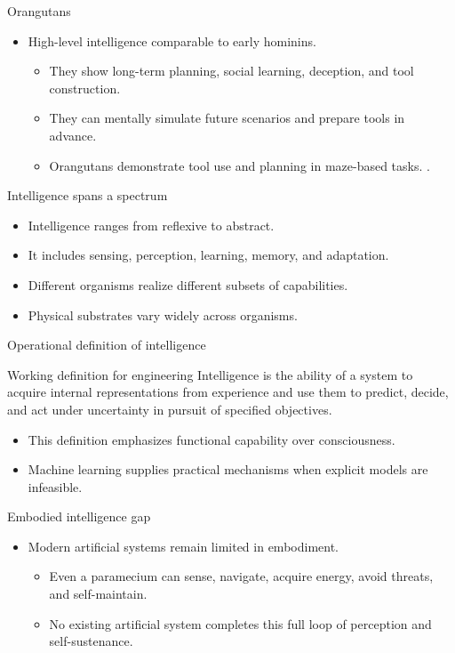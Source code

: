 \documentclass[12pt]{beamer}
\begin{document}
\begin{frame}{Orangutans}
  \begin{itemize}
    \item High-level intelligence comparable to early hominins.
      \begin{itemize}
        \item They show long-term planning, social learning, deception, and tool construction.
        \item They can mentally simulate future scenarios and prepare tools in advance.
        \item Orangutans demonstrate tool use and planning in maze-based tasks. .
       \end{itemize}
  \end{itemize}
\end{frame}

\begin{frame}{Intelligence spans a spectrum}
  \begin{itemize}
    \item Intelligence ranges from reflexive to abstract.
    \item It includes sensing, perception, learning, memory, and adaptation.
    \item Different organisms realize different subsets of capabilities.
    \item Physical substrates vary widely across organisms.
  \end{itemize}
\end{frame}

\begin{frame}{Operational definition of intelligence}
  \begin{conceptbox}{Working definition for engineering}
    Intelligence is the ability of a system to acquire internal representations from experience and
    use them to predict, decide, and act under uncertainty in pursuit of specified objectives.
  \end{conceptbox}
  \begin{itemize}
    \item This definition emphasizes functional capability over consciousness.
    \item Machine learning supplies practical mechanisms when explicit models are infeasible.
  \end{itemize}
\end{frame}

\begin{frame}{Embodied intelligence gap}
  \begin{itemize}
    \item Modern artificial systems remain limited in embodiment.
      \begin{itemize}
        \item Even a paramecium can sense, navigate, acquire energy, avoid threats, and self-maintain.
        \item No existing artificial system completes this full loop of perception and self-sustenance.
      \end{itemize}
  \end{itemize}
\end{frame}
\end{document}
